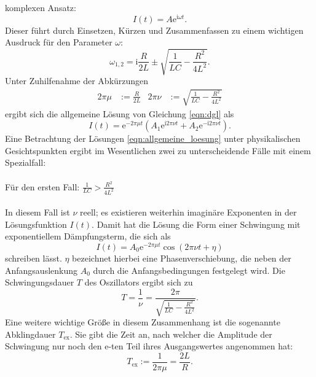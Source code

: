 \documentclass[
  bibliography=totoc,     %
  captions=tableheading,  %
  titlepage=firstiscover, %
]{scrartcl}
\begin{document}
komplexen Ansatz:
\begin{equation}
    I(t)=A\mathup{e}^{\mathup{i}\omega t}.
    \label{eqn:ansatz}
\end{equation}
Dieser führt durch Einsetzen, Kürzen und Zusammenfassen zu einem wichtigen
Ausdruck für den Parameter $\omega$:
\begin{equation}
    \omega_{1,2}=\mathup{i}\frac{R}{2L}\pm\sqrt{\frac{1}{LC}-\frac{R^2}{4L^2}}.
    \label{eqn:omega}
\end{equation}
Unter Zuhilfenahme der Abkürzungen
\begin{align}
    2\pi\mu&:=\frac{R}{2L} & 2\pi\nu&:=\sqrt{\frac{1}{LC}-\frac{R^2}{4L^2}}
    \label{eqn:abkuerzungen}
\end{align}
ergibt sich die allgemeine Lösung von Gleichung \eqref{eqn:dgl} als
\begin{equation}
    I(t)=\mathup{e}^{-2\pi\mu t}\left(A_1\mathup{e}^{\mathup{i}2\pi\nu t}+A_2\mathup{e}^{-\mathup{i}2\pi\nu t}\right).
    \label{eqn:allgemeine_loesung}
\end{equation}
Eine Betrachtung der Lösungen \eqref{eqn:allgemeine_loesung} unter physikalischen
Gesichtspunkten ergibt im Wesentlichen zwei zu unterscheidende Fälle mit einem
Spezialfall:\\
\\
Für den ersten Fall: $\frac{1}{LC}>\frac{R^2}{4L^2}$ \\
\\
In diesem Fall ist $\nu$ reell; es existieren weiterhin imaginäre Exponenten in
der Lösungsfunktion $I(t)$. Damit hat die Lösung die Form einer Schwingung mit
exponentiellem Dämpfungsterm, die sich als
\begin{equation}
    I(t)=A_0\mathup{e}^{-2\pi\mu t}\cos{\left(2\pi\nu t+\eta\right)}
    \label{eqn:schwingfall}
\end{equation}
schreiben lässt. $\eta$ bezeichnet hierbei eine Phasenverschiebung, die neben
der Anfangsauslenkung $A_0$ durch die Anfangsbedingungen festgelegt wird. Die
Schwingungsdauer $T$ des Oszillators ergibt sich zu
\begin{equation}
    T=\frac{1}{\nu}=\frac{2\pi}{\sqrt{\frac{1}{LC}-\frac{R^2}{4L^2}}}.
    \label{eqn:schwingungsdauer}
\end{equation}
Eine weitere wichtige Größe in diesem Zusammenhang ist die sogenannte
Abklingdauer $T_{\mathup{ex}}$. Sie gibt die Zeit an, nach welcher die Amplitude
der Schwingung nur noch den $\mathup{e}$-ten Teil ihres Ausgangswertes angenommen hat:
\begin{equation}
    T_{\mathup{ex}}:=\frac{1}{2\pi\mu}=\frac{2L}{R}.
    \label{eqn:abklingdauer}
\end{equation}\\
\end{document}
